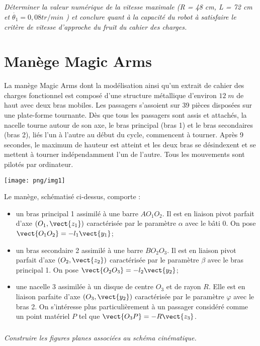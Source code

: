 \documentclass[10pt,oneside]{article}
\begin{document}
\subparagraph{}
\textit{Déterminer la valeur numérique de la vitesse maximale (R = 48 cm, L = 72 cm et $\dot{\theta_1}= 0,08 tr/min$ ) et conclure quant à la capacité du robot à satisfaire le critère de vitesse d'approche du fruit du cahier des charges. }

\section*{Manège Magic Arms } 
\setcounter{subparagraph}{0}

La manège Magic Arms dont la modélisation ainsi qu'un extrait de cahier des charges fonctionnel est composé d'une structure métallique d'environ $12\; m$ de haut avec deux bras mobiles. Les passagers s'assoient sur 39 pièces disposées sur une plate-forme tournante. Dès que tous les passagers sont assis et attachés, la nacelle tourne autour de son axe, le bras principal (bras 1) et le bras secondaires (bras 2), liés l'un à l'autre au début du cycle, commencent à tourner. Après 9 secondes, le maximum de hauteur est atteint et les deux bras se désindexent et se mettent à tourner indépendamment l'un de l'autre. Tous les mouvements sont pilotés par ordinateur. 

\begin{center}
\texttt{[image: png/img1]}
\end{center}

Le manège, schématisé ci-dessus, comporte :
\begin{itemize}
\item un bras principal 1 assimilé à une barre $AO_1O_2$. Il est en liaison pivot parfait d'axe $(O_1,\vect{z_1})$ caractérisée par le paramètre $\alpha$ avec le bâti 0. On pose $\vect{O_1O_2}=-l_1\vect{y_1}$;
\item un bras secondaire 2 assimilé à une barre $BO_2O_3$. Il est en liaison pivot parfait d'axe $(O_2,\vect{z_2})$ caractérisée par le paramètre $\beta$ avec le bras principal 1. On pose $\vect{O_2O_3}=-l_2\vect{y_2}$;
\item une nacelle 3 assimilée à un disque de centre $O_3$ et de rayon $R$. Elle est en liaison parfaite d'axe $(O_3,\vect{y_2})$ caractérisée par le paramètre $\varphi$ avec le bras 2. On s'intéresse plus particulièrement à un passager considéré comme un point matériel $P$ tel que $\vect{O_3P}=-R\vect{z_3}$.
\end{itemize}
\subparagraph{}
\textit{Construire les figures planes associées au schéma cinématique.}
\end{document}
